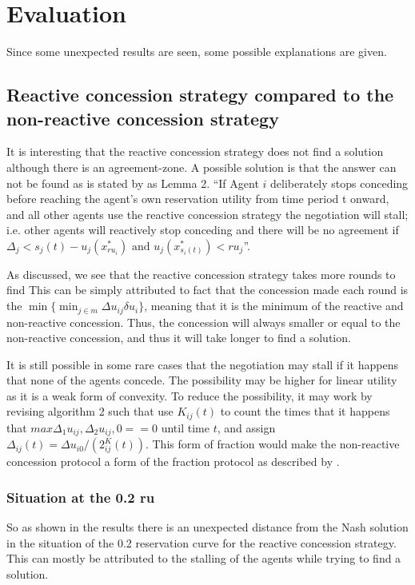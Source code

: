 \clearpage
\section{Evaluation}
Since some unexpected results are seen, some possible explanations are given.
\subsection{Reactive concession strategy compared to the non-reactive concession strategy}
It is interesting that the reactive concession strategy does not find a solution although there is an agreement-zone. 
A possible solution is that the answer can not be found as is stated by \citet{zheng2015automated} as Lemma 2. ``If Agent $i$ deliberately stops conceding before reaching the agent's own reservation utility from time period t onward, and all other agents use the reactive concession strategy the negotiation will stall; i.e. other agents will reactively stop conceding and there will be no agreement if $\Delta_j < s_j(t)-u_j(x^*_{ru_i}) \text{ and } u_j(x^*_{s_i(t)})<ru_j$''.

As discussed, we see that the reactive concession strategy takes more rounds to find  This can be simply attributed to fact that the concession made each round is the $\displaystyle \min\{ \min_{j \in m}\Delta u_{ij} \delta u_i\}$, meaning that it is the minimum of the reactive and non-reactive concession. Thus, the concession will always smaller or equal to the non-reactive concession, and thus it will take longer to find a solution.

It is still possible in some rare cases that the negotiation may stall if it happens that none of the agents concede. The possibility may be higher for linear utility as it is a weak form of convexity. To reduce the possibility, it may work by revising algorithm 2 such that use $K_{ij}(t)$ to count the times that it happens that $max{ \Delta_1 u_{ij},\Delta_2 u_{ij}, 0 } == 0$ until time $t$, and assign $\Delta_{ij}(t) =  \Delta u_{i0}/(2^K_{ij}(t))$. This form of fraction would make the non-reactive concession protocol a form of the fraction protocol as described by \citet{wu2009efficient}.

\subsubsection{Situation at the 0.2 ru}
So as shown in the results there is an unexpected distance from the Nash solution in the situation of the 0.2 reservation curve for the reactive concession strategy. This can mostly be attributed to the stalling of the agents while trying to find a solution.


